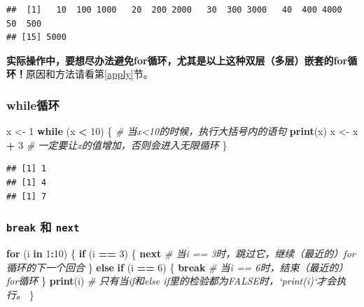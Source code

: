 \documentclass[]{book}
\newenvironment{Shaded}{\begin{snugshade}}{\end{snugshade}}
\newcommand{\CommentTok}[1]{\textcolor[rgb]{0.56,0.35,0.01}{\textit{#1}}}
\newcommand{\ControlFlowTok}[1]{\textcolor[rgb]{0.13,0.29,0.53}{\textbf{#1}}}
\newcommand{\DecValTok}[1]{\textcolor[rgb]{0.00,0.00,0.81}{#1}}
\newcommand{\KeywordTok}[1]{\textcolor[rgb]{0.13,0.29,0.53}{\textbf{#1}}}
\newcommand{\NormalTok}[1]{#1}
\newcommand{\OperatorTok}[1]{\textcolor[rgb]{0.81,0.36,0.00}{\textbf{#1}}}
\newcommand{\StringTok}[1]{\textcolor[rgb]{0.31,0.60,0.02}{#1}}
\begin{document}
\begin{verbatim}
##  [1]   10  100 1000   20  200 2000   30  300 3000   40  400 4000   50  500
## [15] 5000
\end{verbatim}

\textbf{实际操作中，要想尽办法避免for循环，尤其是以上这种双层（多层）嵌套的for循环！}原因和方法请看第\ref{apply}节。

\hypertarget{while}{%
\subsubsection{while循环}\label{while}}

\begin{Shaded}
\begin{Highlighting}[]
\NormalTok{x <-}\StringTok{ }\DecValTok{1}
\ControlFlowTok{while}\NormalTok{ (x }\OperatorTok{<}\StringTok{ }\DecValTok{10}\NormalTok{) \{ }\CommentTok{# 当x<10的时候，执行大括号内的语句}
  \KeywordTok{print}\NormalTok{(x)}
\NormalTok{  x <-}\StringTok{ }\NormalTok{x }\OperatorTok{+}\StringTok{ }\DecValTok{3} \CommentTok{# 一定要让x的值增加，否则会进入无限循环}
\NormalTok{\}}
\end{Highlighting}
\end{Shaded}

\begin{verbatim}
## [1] 1
## [1] 4
## [1] 7
\end{verbatim}

\hypertarget{break--next}{%
\subsubsection{\texorpdfstring{\texttt{break} 和 \texttt{next}}{break 和 next}}\label{break--next}}

\begin{Shaded}
\begin{Highlighting}[]
\ControlFlowTok{for}\NormalTok{ (i }\ControlFlowTok{in} \DecValTok{1}\OperatorTok{:}\DecValTok{10}\NormalTok{) \{}
  \ControlFlowTok{if}\NormalTok{ (i }\OperatorTok{==}\StringTok{ }\DecValTok{3}\NormalTok{) \{}
    \ControlFlowTok{next} \CommentTok{# 当i == 3时，跳过它，继续（最近的）for循环的下一个回合}
\NormalTok{  \} }\ControlFlowTok{else} \ControlFlowTok{if}\NormalTok{ (i }\OperatorTok{==}\StringTok{ }\DecValTok{6}\NormalTok{) \{}
    \ControlFlowTok{break} \CommentTok{# 当i == 6时，结束（最近的）for循环}
\NormalTok{  \} }
  \KeywordTok{print}\NormalTok{(i) }\CommentTok{# 只有当if和else if里的检验都为FALSE时，`print(i)`才会执行。}
\NormalTok{\}}
\end{Highlighting}
\end{Shaded}
\end{document}

